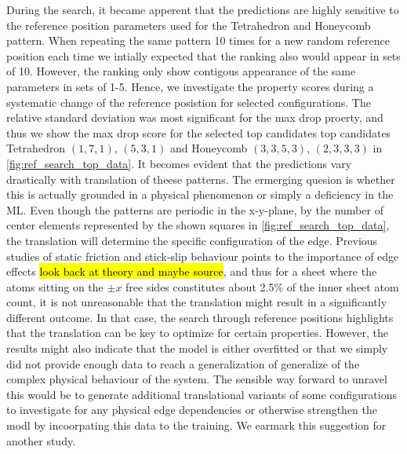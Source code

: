 During the search, it became apperent that the predictions are highly sensitive
to the reference position parameters used for the Tetrahedron and Honeycomb
pattern. When repeating the same pattern 10 times for a new random reference
position each time we intially expected that the ranking also would appear in
sets of 10. However, the ranking only show contigous appearance of the same
parameters in sets of 1-5. Hence, we investigate the property scores during a
systematic change of the reference posistion for selected configurations. The
relative standard deviation was most significant for the max drop proerty, and
thus we show the max drop score for the selected top candidates top candidates
Tetrahedron $(1,7,1)$, $(5,3,1)$ and Honeycomb $(3,3,5,3)$, $(2,3,3,3)$ in
\cref{fig:ref_search_top_data}. It becomes evident that the predictions vary
drastically with translation of theese patterns. The ermerging quesion is whether this is actually grounded in a physical phenomenon or simply a deficiency in the \acrshort{ML}. Even though the patterns are periodic in the x-y-plane, by the number of center elements represented by the shown squares in \cref{fig:ref_search_top_data}, the translation will determine the specific configuration of the edge. Previous studies of static friction and stick-slip behaviour points to the importance of edge effects \hl{look back at theory and
maybe source}, and thus for a sheet where the atoms sitting on the $\pm x$ free sides  constitutes about 2.5\% of the inner sheet atom count, it is not unreasonable
that the translation might result in a significantly different outcome. In that case, the search through reference positions highlights that the translation can be key to optimize for certain properties. However, the results might also indicate that the model is either overfitted or that we simply did not provide enough data to reach a generalization of generalize of the complex physical behaviour of the system. The sensible way forward to unravel this would be to generate additional
translational variants of some configurations to investigate for any physical edge dependencies or otherwise strengthen the modl by incoorpating this data to the training. We earmark this suggestion for another study.



